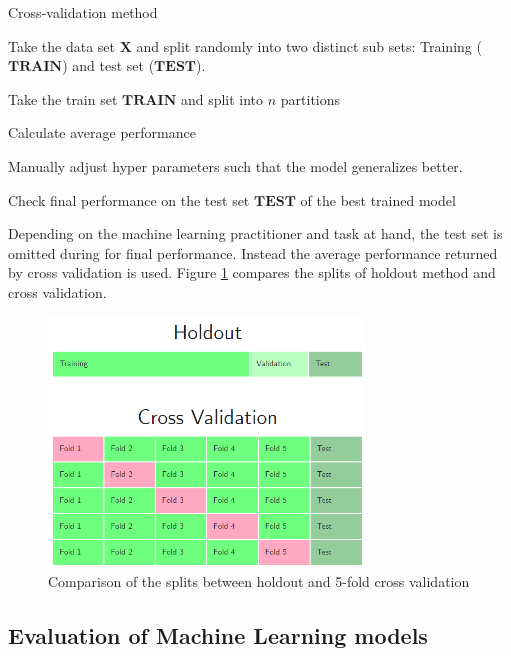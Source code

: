 \documentclass[draft,final,oneside]{vutinfth} %
\begin{document}
\begin{algorithm}
\caption{Cross-validation method}\label{holdoutalgo}
Take the data set $\boldsymbol{X}$ and split randomly into two distinct sub sets: Training ($\boldsymbol{TRAIN}$) and test set ($\boldsymbol{TEST}$).

 {
Take the train set $\boldsymbol{TRAIN}$ and split into $n$ partitions


Calculate average performance

Manually adjust hyper parameters such that the model generalizes better.
}

Check final performance on the test set $\boldsymbol{TEST}$ of the best trained model

\end{algorithm}

Depending on the machine learning practitioner and task at hand, the test set is omitted during for final performance. Instead the average performance returned by cross validation is used. Figure \ref{fig:holdoutvscv} compares the splits of holdout method and cross validation.

\begin{figure}[ht]
	\centering
  	\includegraphics[width=0.75\textwidth]{graphics/holdoutvscv.png}
	\caption{Comparison of the splits between holdout and 5-fold cross validation}
	\label{fig:holdoutvscv}
\end{figure}

\subsection{Evaluation of Machine Learning models}
\end{document}
